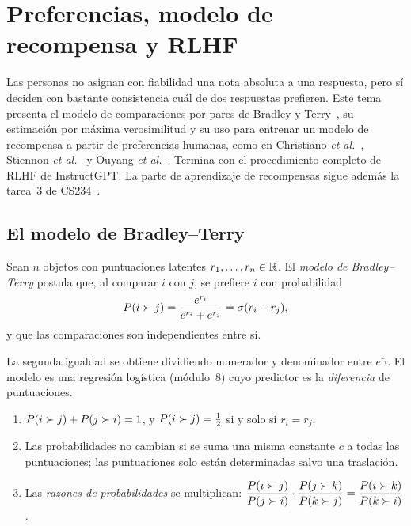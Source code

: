 \chapter{Preferencias, modelo de recompensa y RLHF}
\label{tema:4}

Las personas no asignan con fiabilidad una nota absoluta a una respuesta, pero sí deciden con bastante consistencia cuál de dos respuestas prefieren. Este tema presenta el modelo de comparaciones por pares de Bradley y Terry~\cite{bt}, su estimación por máxima verosimilitud y su uso para entrenar un modelo de recompensa a partir de preferencias humanas, como en Christiano \emph{et al.}~\cite{christiano}, Stiennon \emph{et al.}~\cite{stiennon} y Ouyang \emph{et al.}~\cite{instructgpt}. Termina con el procedimiento completo de RLHF de InstructGPT. La parte de aprendizaje de recompensas sigue además la tarea~3 de CS234~\cite{cs234a3}.

\section{El modelo de Bradley--Terry}

\begin{definicion}\label{def:bt}
Sean $n$ objetos con puntuaciones latentes $r_1,\dots,r_n\in\mathbb{R}$. El \emph{modelo de Bradley--Terry} postula que, al comparar $i$ con $j$, se prefiere $i$ con probabilidad
\[
P(i\succ j)=\frac{e^{r_i}}{e^{r_i}+e^{r_j}}=\sigma(r_i-r_j),
\]
y que las comparaciones son independientes entre sí.
\end{definicion}

La segunda igualdad se obtiene dividiendo numerador y denominador entre $e^{r_i}$. El modelo es una regresión logística (módulo~8) cuyo predictor es la \emph{diferencia} de puntuaciones.

\begin{proposicion}[Propiedades]\label{prop:bt}
\begin{enumerate}
  \item $P(i\succ j)+P(j\succ i)=1$, y $P(i\succ j)=\tfrac12$ si y solo si $r_i=r_j$.
  \item Las probabilidades no cambian si se suma una misma constante $c$ a todas las puntuaciones; las puntuaciones solo están determinadas salvo una traslación.
  \item Las \emph{razones de probabilidades} se multiplican: $\dfrac{P(i\succ j)}{P(j\succ i)}\cdot\dfrac{P(j\succ k)}{P(k\succ j)}=\dfrac{P(i\succ k)}{P(k\succ i)}$.
\end{enumerate}
\end{proposicion}


